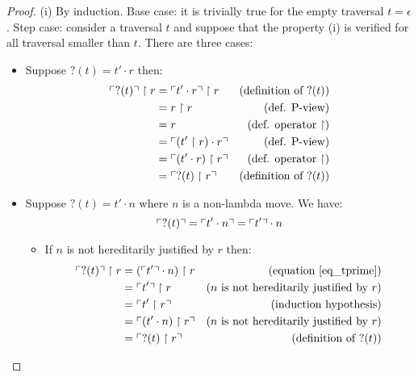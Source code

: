 \begin{proof}
(i) By induction. Base case: it is trivially true for the empty
traversal $t = \epsilon$. Step case: consider a traversal $t$ and
suppose that the property (i) is verified for all traversal smaller
than $t$. There are three cases:
\begin{itemize}
\item Suppose $?(t) = t' \cdot r$ then:
    \begin{align*}
    \ulcorner ?(t) \urcorner \upharpoonright  r
        &=  \ulcorner t' \cdot r  \urcorner \upharpoonright  r       & (\mbox{definition of } ?(t))\\
        &=  r \upharpoonright  r                         & (\mbox{def. P-view})\\
        &=  r                                                & (\mbox{def. operator $\upharpoonright$})\\
        &=  \ulcorner (t' \upharpoonright  r ) \cdot r  \urcorner    & (\mbox{def. P-view})\\
        &=  \ulcorner (t' \cdot r)  \upharpoonright  r  \urcorner    & (\mbox{def. operator $\upharpoonright$})\\
        &= \ulcorner ?(t) \upharpoonright  r  \urcorner                & (\mbox{definition of } ?(t))
    \end{align*}

\item Suppose $?(t) = t' \cdot n$ where $n$ is a non-lambda
move. We have:
    \begin{equation}
    \ulcorner ?(t) \urcorner = \ulcorner t' \cdot n \urcorner = \ulcorner t' \urcorner \cdot n  \label{eq_tprime}
    \end{equation}
    \begin{itemize}
    \item If $n$ is not hereditarily justified by $r$ then:
    \begin{align*}
    \ulcorner ?(t) \urcorner \upharpoonright  r
        &= (\ulcorner t' \urcorner \cdot n) \upharpoonright  r  & (\mbox{equation \ref{eq_tprime}}) \\
        &= \ulcorner t' \urcorner \upharpoonright  r            & (n \mbox{ is not hereditarily justified by } r) \\
        &= \ulcorner t' \upharpoonright  r  \urcorner           & (\mbox{induction hypothesis}) \\
        &= \ulcorner (t' \cdot n) \upharpoonright  r  \urcorner & (n \mbox{ is not hereditarily justified by } r) \\
        &= \ulcorner ?(t) \upharpoonright  r   \urcorner           & (\mbox{definition of } ?(t))
    \end{align*}


\end{itemize}
\end{itemize}
\end{proof}

